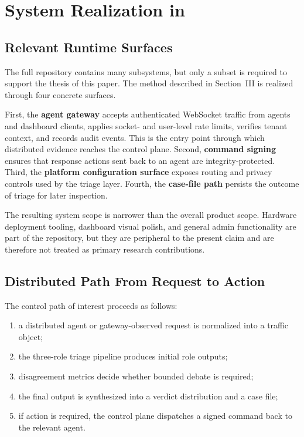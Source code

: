 \section{System Realization in \system}\label{sec:system}

\subsection{Relevant Runtime Surfaces}

The full repository contains many subsystems, but only a subset is required to support the thesis of this paper. The method described in Section~III is realized through four concrete surfaces.

First, the \textbf{agent gateway} accepts authenticated WebSocket traffic from agents and dashboard clients, applies socket- and user-level rate limits, verifies tenant context, and records audit events. This is the entry point through which distributed evidence reaches the control plane. Second, \textbf{command signing} ensures that response actions sent back to an agent are integrity-protected. Third, the \textbf{platform configuration surface} exposes routing and privacy controls used by the triage layer. Fourth, the \textbf{case-file path} persists the outcome of triage for later inspection.

The resulting system scope is narrower than the overall product scope. Hardware deployment tooling, dashboard visual polish, and general admin functionality are part of the repository, but they are peripheral to the present claim and are therefore not treated as primary research contributions.

\subsection{Distributed Path From Request to Action}

The control path of interest proceeds as follows:
\begin{enumerate}
  \item a distributed agent or gateway-observed request is normalized into a traffic object;
  \item the three-role triage pipeline produces initial role outputs;
  \item disagreement metrics decide whether bounded debate is required;
  \item the final output is synthesized into a verdict distribution and a case file;
  \item if action is required, the control plane dispatches a signed command back to the relevant agent.
\end{enumerate}

